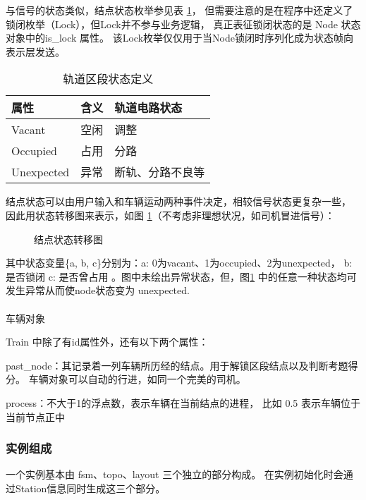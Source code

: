 与信号的状态类似，结点状态枚举参见表 \ref{node_state}，
但需要注意的是在程序中还定义了锁闭枚举（Lock），但Lock并不参与业务逻辑，
真正表征锁闭状态的是 Node 状态对象中的is\_lock 属性。
该Lock枚举仅仅用于当Node锁闭时序列化成为状态帧向表示层发送。
\begin{table}[htpb!]
    \centering
    \caption{\label{node_state}轨道区段状态定义}
    \begin{threeparttable}
        \begin{tabular}{lcl}
            \toprule
            属性       & 含义 & 轨道电路状态     \\
            \midrule
            Vacant     & 空闲 & 调整             \\
            Occupied   & 占用 & 分路             \\
            Unexpected & 异常 & 断轨、分路不良等 \\
            \bottomrule
        \end{tabular}
    \end{threeparttable}
\end{table}

结点状态可以由用户输入和车辆运动两种事件决定，相较信号状态更复杂一些，
因此用状态转移图来表示，如图 \ref{node_fsm}（不考虑非理想状况，如司机冒进信号）：

\begin{figure}[htpb!]
    \centering
    
    \caption{\label{node_fsm}结点状态转移图}
\end{figure}

其中状态变量\{a, b, c\}分别为：a: 0为vacant、1为occupied、2为unexpected， b: 是否锁闭 c: 是否曾占用
。图中未绘出异常状态，但，图\ref{node_fsm} 中的任意一种状态均可发生异常从而使node状态变为 unexpected.

\paragraph{}车辆对象

Train 中除了有id属性外，还有以下两个属性：

past\_node：其记录着一列车辆所历经的结点。用于解锁区段结点以及判断考题得分。
车辆对象可以自动的行进，如同一个完美的司机。

process：不大于1的浮点数，表示车辆在当前结点的进程，
比如 0.5 表示车辆位于当前节点正中


\subsubsection{实例组成}
一个实例基本由 fsm、topo、layout 三个独立的部分构成。
在实例初始化时会通过Station信息同时生成这三个部分。


